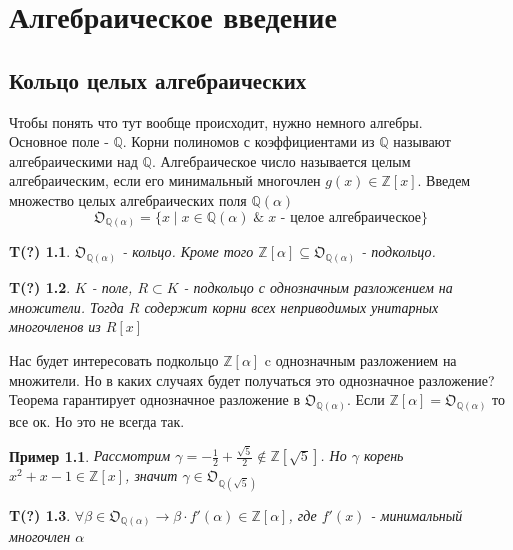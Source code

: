 \documentclass[oneside,final,14pt]{extreport}
\theoremstyle{plain}
\begin{document}
\tableofcontents
\chapter{Алгебраическое введение}
\section{Кольцо целых алгебраических}
Чтобы понять что тут вообще происходит, нужно немного алгебры.\\
Основное поле - $\mathbb{Q}$. Корни полиномов с коэффициентами из 
$\mathbb{Q}$ называют алгебраическими над $\mathbb{Q}$. Алгебраическое число называется целым алгебраическим, если его минимальный многочлен $g(x) \in \mathbb{Z}[x]$. Введем множество целых алгебраических поля 
$\mathbb{Q}(\alpha)$
$$\mathfrak{O}_{\mathbb{Q}(\alpha)}=\{x \;|\; x \in \mathbb{Q}(\alpha
)\; \& \; x\text{ - целое алгебраическое}  \}$$

\newtheorem*{theorem*}{T(?)}
\begin{theorem*}
 $\mathfrak{O}_{\mathbb{Q}(\alpha)}$ - кольцо. Кроме того  $\mathbb{Z}[\alpha] \subseteq \mathfrak{O}_{\mathbb{Q}(\alpha)}$ - подкольцо.
\end{theorem*}


\begin{theorem*}
$K$ - поле, $R \subset K$ - подкольцо с однозначным разложением на множители. Тогда $R$ содержит корни всех неприводимых унитарных многочленов из $R[x]$
\end{theorem*}

Нас будет интересовать подкольцо $\mathbb{Z}[\alpha]$ c однозначным разложением на множители. Но в каких случаях будет получаться это однозначное разложение? Теорема гарантирует однозначное разложение в 
$\mathfrak{O}_{\mathbb{Q}(\alpha)}$. Если $\mathbb{Z}[\alpha]=\mathfrak{O}_{\mathbb{Q}(\alpha)}$ то все ок. Но это не всегда так.


\newtheorem*{remark*}{Пример}
\begin{remark*}
Рассмотрим $\gamma=-\frac{1}{2}+\frac{\sqrt{5}}{2} \notin \mathbb{Z}[\sqrt{5}]$.
Но $\gamma$ корень $x^2+x-1 \in \mathbb{Z}[x]$, значит $\gamma \in \mathfrak{O}_{\mathbb{Q}(\sqrt{5})}$
\end{remark*}

\begin{theorem*}
$\forall \beta \in \mathfrak{O}_{\mathbb{Q}(\alpha)} \rightarrow \beta \cdot f'(\alpha) \in \mathbb{Z}[\alpha]$, где $f'(x)$ - минимальный многочлен $\alpha$
\end{theorem*}
\end{document}
